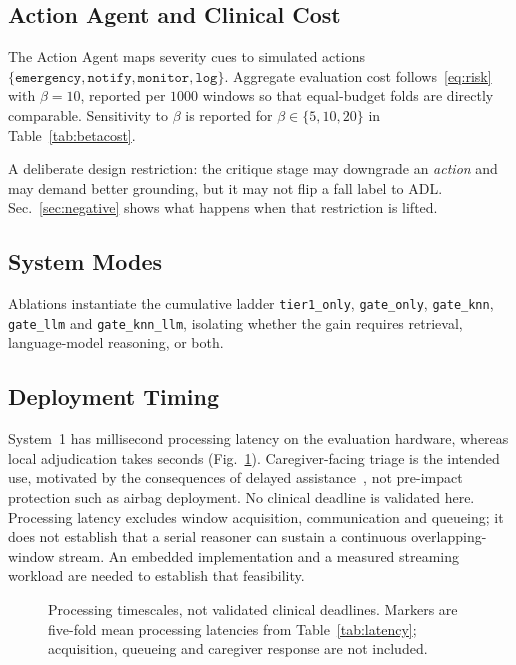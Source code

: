 \documentclass[journal]{IEEEtran}
\begin{document}
\subsection{Action Agent and Clinical Cost}
The Action Agent maps severity cues to simulated actions $\{\texttt{emergency},\texttt{notify},\texttt{monitor},\texttt{log}\}$. Aggregate evaluation cost follows~\eqref{eq:risk} with $\beta{=}10$, reported per $1000$ windows so that equal-budget folds are directly comparable. Sensitivity to $\beta$ is reported for $\beta\in\{5,10,20\}$ in Table~\ref{tab:betacost}.

A deliberate design restriction: the critique stage may downgrade an \emph{action} and may demand better grounding, but it may not flip a fall label to ADL. Sec.~\ref{sec:negative} shows what happens when that restriction is lifted.

\subsection{System Modes}
Ablations instantiate the cumulative ladder \texttt{tier1\_only}, \texttt{gate\_only}, \texttt{gate\_knn}, \texttt{gate\_llm} and \texttt{gate\_knn\_llm}, isolating whether the gain requires retrieval, language-model reasoning, or both.

\subsection{Deployment Timing}
\label{sec:deployment}
System~1 has millisecond processing latency on the evaluation hardware, whereas local adjudication takes seconds (Fig.~\ref{fig:timeline}). Caregiver-facing triage is the intended use, motivated by the consequences of delayed assistance~\cite{fleming2008longlie}, not pre-impact protection such as airbag deployment. No clinical deadline is validated here. Processing latency excludes window acquisition, communication and queueing; it does not establish that a serial reasoner can sustain a continuous overlapping-window stream. An embedded implementation and a measured streaming workload are needed to establish that feasibility.

\begin{figure}[!t]
\centering
\resizebox{\linewidth}{!}{}
\caption{Processing timescales, not validated clinical deadlines. Markers are five-fold mean processing latencies from Table~\ref{tab:latency}; acquisition, queueing and caregiver response are not included.}
\label{fig:timeline}
\end{figure}
\end{document}
